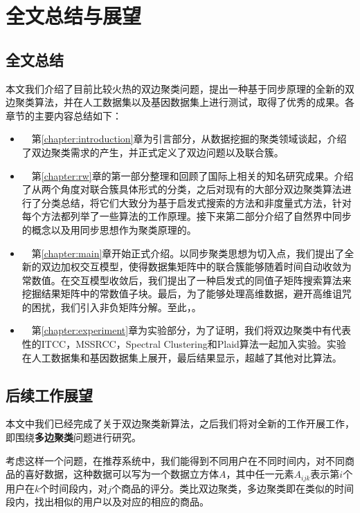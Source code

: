 
\chapter{全文总结与展望}
\label{chapter:conclusion}
\section{全文总结}
本文我们介绍了目前比较火热的双边聚类问题，提出一种基于同步原理的全新的双边聚类算法\cosync，并在人工数据集以及基因数据集上进行测试，取得了优秀的成果。各章节的主要内容总结如下：

\begin{itemize}
  \item ~~第\ref{chapter:introduction}章为引言部分，从数据挖掘的聚类领域谈起，介绍了双边聚类需求的产生，并正式定义了双边问题以及联合簇。
  \item ~~第\ref{chapter:rw}章的第一部分整理和回顾了国际上相关的知名研究成果。介绍了从两个角度对联合簇具体形式的分类，之后对现有的大部分双边聚类算法进行了分类总结，将它们大致分为基于启发式搜索的方法和非度量式方法，针对每个方法都列举了一些算法的工作原理。接下来第二部分介绍了自然界中同步的概念以及用同步思想作为聚类原理的。
  \item ~~第\ref{chapter:main}章开始正式介绍。以同步聚类思想为切入点，我们提出了全新的双边加权交互模型，使得数据集矩阵中的联合簇能够随着时间自动收敛为常数值。在交互模型收敛后，我们提出了一种启发式的同值子矩阵搜索算法来挖掘结果矩阵中的常数值子块。最后，为了能够处理高维数据，避开高维诅咒的困扰，我们引入非负矩阵分解。至此，。
  \item ~~第\ref{chapter:experiment}章为实验部分，为了证明，我们将双边聚类中有代表性的ITCC，MSSRCC，Spectral Clustering和Plaid算法一起加入实验。实验在人工数据集和基因数据集上展开，最后结果显示，超越了其他对比算法。
\end{itemize}


\section{后续工作展望}
本文中我们已经完成了关于双边聚类新算法，之后我们将对全新的工作开展工作，即围绕\textbf{多边聚类}问题进行研究。

考虑这样一个问题，在推荐系统中，我们能得到不同用户在不同时间内，对不同商品的喜好数据，这种数据可以写为一个数据立方体$A$，其中任一元素$A_{ijk}$表示第$i$个用户在$k$个时间段内，对$j$个商品的评分。类比双边聚类，多边聚类即在类似的时间段内，找出相似的用户以及对应的相应的商品。

